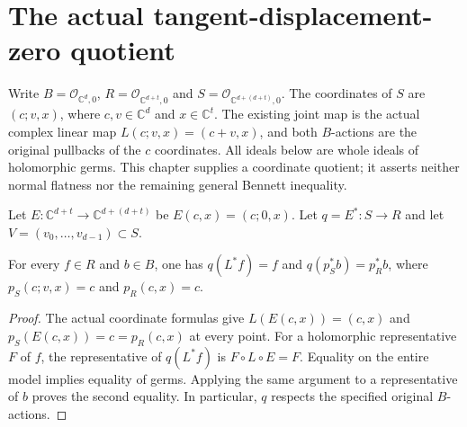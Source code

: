 \section{The actual tangent-displacement-zero quotient}

Write $B=\mathcal O_{\mathbb C^d,0}$, $R=\mathcal O_{\mathbb C^{d+t},0}$
and $S=\mathcal O_{\mathbb C^{d+(d+t)},0}$. The coordinates of $S$ are
$(c;v,x)$, where $c,v\in\mathbb C^d$ and $x\in\mathbb C^t$.
The existing joint map is the actual complex linear map
$L(c;v,x)=(c+v,x)$, and both $B$-actions are the original pullbacks of
the $c$ coordinates. All ideals below are whole ideals of holomorphic
germs. This chapter supplies a coordinate quotient; it asserts neither
normal flatness nor the remaining general Bennett inequality.

\begin{definition}
\label{hir:tangent-displacement-zero-trace}
\leanok
Let $E:\mathbb C^{d+t}\longrightarrow\mathbb C^{d+(d+t)}$ be
$E(c,x)=(c;0,x)$. Let $q=E^*:S\longrightarrow R$ and let
$V=(v_0,\ldots,v_{d-1})\subset S$.
\end{definition}

\begin{lemma}
\label{hir:tangent-displacement-zero-retractions}
\leanok
For every $f\in R$ and $b\in B$, one has $q(L^*f)=f$ and
$q(p_S^*b)=p_R^*b$, where $p_S(c;v,x)=c$ and $p_R(c,x)=c$.
\end{lemma}
\begin{proof}
The actual coordinate formulas give $L(E(c,x))=(c,x)$ and
$p_S(E(c,x))=c=p_R(c,x)$ at every point. For a holomorphic
representative $F$ of $f$, the representative of $q(L^*f)$ is
$F\circ L\circ E=F$. Equality on the entire model implies equality
of germs. Applying the same argument to a representative of $b$
proves the second equality. In particular, $q$ respects the specified
original $B$-actions.
\end{proof}


